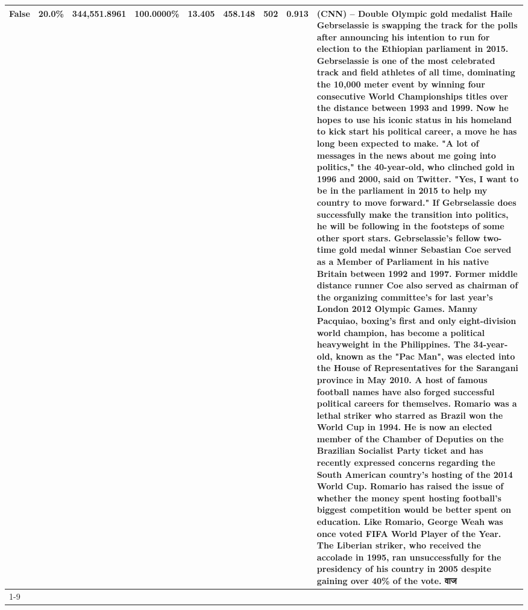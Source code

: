 \begin{table}[H]
{\begin{tabular}{lllrlllll}
False & 20.0\% & 344,551.8961 & \bfseries \color{red} 100.0000\% & 13.405 & 458.148 & 502 & 0.913 & (CNN) -- Double Olympic gold medalist Haile Gebrselassie is swapping the track for the polls after announcing his intention to run for election to the Ethiopian parliament in 2015. Gebrselassie is one of the most celebrated track and field athletes of all time, dominating the 10,000 meter event by winning four consecutive World Championships titles over the distance between 1993 and 1999. Now he hopes to use his iconic status in his homeland to kick start his political career, a move he has long been expected to make. "A lot of messages in the news about me going into politics," the 40-year-old, who clinched gold in 1996 and 2000, said on Twitter. "Yes, I want to be in the parliament in 2015 to help my country to move forward." If Gebrselassie does successfully make the transition into politics, he will be following in the footsteps of some other sport stars. Gebrselassie's fellow two-time gold medal winner Sebastian Coe served as a Member of Parliament in his native Britain between 1992 and 1997. Former middle distance runner Coe also served as chairman of the organizing committee's for last year's London 2012 Olympic Games. Manny Pacquiao, boxing's first and only eight-division world champion, has become a political heavyweight in the Philippines. The 34-year-old, known as the "Pac Man", was elected into the House of Representatives for the Sarangani province in May 2010. A host of famous football names have also forged successful political careers for themselves. Romario was a lethal striker who starred as Brazil won the World Cup in 1994. He is now an elected member of the Chamber of Deputies on the Brazilian Socialist Party ticket and has recently expressed concerns regarding the South American country's hosting of the 2014 World Cup. Romario has raised the issue of whether the money spent hosting football's biggest competition would be better spent on education. Like Romario, George Weah was once voted FIFA World Player of the Year. The Liberian striker, who received the accolade in 1995, ran unsuccessfully for the presidency of his country in 2005 despite gaining over 40\% of the vote. वाज \\
\cline{1-9}

\end{tabular}}
\end{table}
